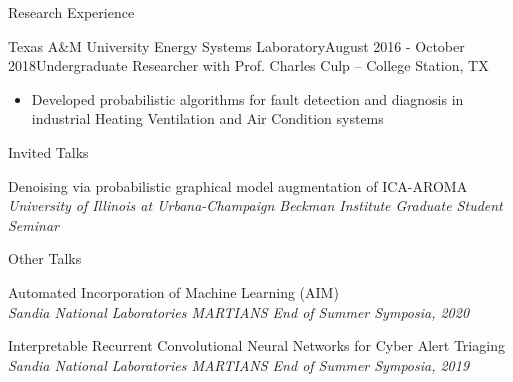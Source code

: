 \documentclass{resume} %
\begin{document}
\begin{rSection}{Research Experience}
\begin{rSubsection}{Texas A\&M University Energy Systems Laboratory}{August 2016 - October 2018}{Undergraduate Researcher with Prof. Charles Culp -- College Station, TX}
\begin{itemize}
    \setlength\itemsep{0em}
    \item Developed probabilistic algorithms for fault detection and diagnosis in industrial Heating Ventilation and Air Condition systems
\end{itemize}
\end{rSubsection}
\end{rSection}


\begin{rSection}{Invited Talks}
\begin{etaremune}[label={\arabic*.}]
    \setlength\itemsep{0em}
    \item Denoising via probabilistic graphical model augmentation of ICA-AROMA\\
    \textit{University of Illinois at Urbana-Champaign Beckman Institute Graduate Student Seminar}
\end{etaremune}
\end{rSection}

\begin{rSection}{Other Talks}
\begin{etaremune}[label={\arabic*.}]
    \setlength\itemsep{0em}
    \item Automated Incorporation of Machine Learning (AIM) \\
    \textit{Sandia National Laboratories MARTIANS End of Summer Symposia, 2020}
    \item Interpretable Recurrent Convolutional Neural Networks for Cyber Alert Triaging \\
    \textit{Sandia National Laboratories MARTIANS End of Summer Symposia, 2019}
\end{etaremune}
\end{rSection}

\end{document}
